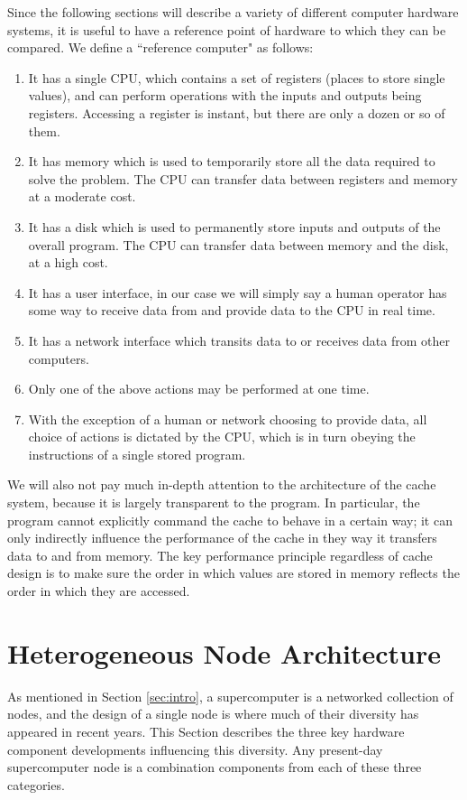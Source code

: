 Since the following sections will describe a variety
of different computer hardware systems, it is useful to have a reference
point of hardware to which they can be compared.
We define a ``reference computer" as follows:

\begin{enumerate}
\item It has a single CPU, which contains a set
of registers (places to store single values),
and can perform operations with the inputs
and outputs being registers.
Accessing a register is instant, but there are
only a dozen or so of them.
\item It has memory which is used to temporarily store
all the data required to solve the problem.
The CPU can transfer data between registers
and memory at a moderate cost.
\item It has a disk which is used to permanently store
inputs and outputs of the overall program.
The CPU can transfer data between memory
and the disk, at a high cost.
\item It has a user interface, in our case
we will simply say a human operator has
some way to receive data from and provide
data to the CPU in real time.
\item It has a network interface which transits
data to or receives data from other computers.
\item Only one of the above actions may be
performed at one time.
\item With the exception of a human or network choosing
to provide data, all choice of actions is
dictated by the CPU, which is in turn obeying
the instructions of a single stored program.
\end{enumerate}

We will also not pay much in-depth attention to the
architecture of the cache system, because it
is largely transparent to the program.
In particular, the program cannot explicitly
command the cache to behave in a certain way;
it can only indirectly influence the performance
of the cache in they way it transfers data to and
from memory.
The key performance principle regardless of cache design is
to make sure the order in which values are stored
in memory reflects the order in which they are accessed.

\section{Heterogeneous Node Architecture}

As mentioned in Section \ref{sec:intro}, a supercomputer is
a networked collection of nodes, and the design of a single node
is where much of their diversity has appeared in recent years.
This Section describes the three key hardware component developments
influencing this diversity.
Any present-day supercomputer node is a combination components
from each of these three categories.

